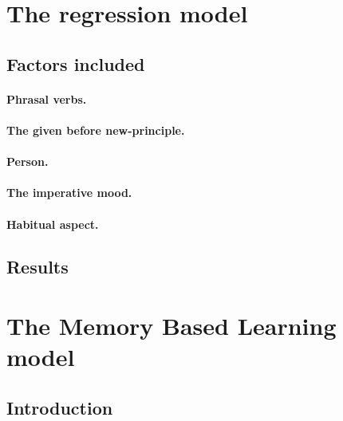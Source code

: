 \documentclass[12pt]{article}
\begin{document}
\section{The regression model} \label{regression}

\subsection{Factors included}

\paragraph{Phrasal verbs.}

\paragraph{The given before new-principle.}

\paragraph{Person.}

\paragraph{The imperative mood.}

\paragraph{Habitual aspect.}


\subsection{Results}








\section{The Memory Based Learning model} \label{mbl}

\subsection{Introduction}
\end{document}
